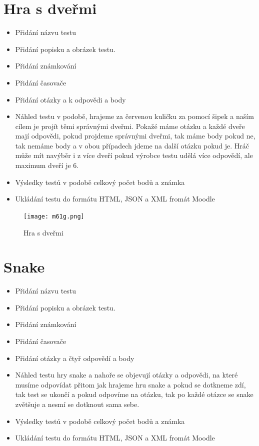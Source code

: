 \documentclass[12pt, a4paper, twoside, openright]{report}
\begin{document}
	\section{Hra s dveřmi}

\begin{itemize}
		\item Přidání názvu testu
		\item Přidání popisku a obrázek testu.
		\item Přidání známkování
		\item Přidání časovače
            \item Přidání otázky a k odpovědi a body
            \item Náhled testu v podobě, hrajeme za červenou kuličku za pomocí šipek a naším cílem je projít těmi
            správnými dveřmi. Pokažé máme otázku a každé dveře mají odpovědi, pokud projdeme správnými dveřmi, tak
            máme body pokud ne, tak nemáme body a v obou případech jdeme na další otázku pokud je. Hráč může mít navýběr i z více dveří pokud výrobce testu udělá více odpovědí, ale maximum dveří je 6.
            \item Výsledky testů v podobě celkový počet bodů a známka
            \item Ukládání testu do formátu HTML, JSON a XML fromát Moodle
	\end{itemize}

    \begin{figure}[h]
		\centering
		\texttt{[image: m61g.png]}
		\caption{Hra s dveřmi}
		\label{fig:architecture}
	\end{figure}

    \section{Snake}

\begin{itemize}
		\item Přidání názvu testu
		\item Přidání popisku a obrázek testu.
		\item Přidání známkování
		\item Přidání časovače
            \item Přidání otázky a čtyř odpovědí a body
            \item Náhled testu hry snake a nahoře se objevují otázky a odpovědi, na které musíme odpovídat přitom jak hrajeme hru snake a pokud se dotkneme zdí, tak test se ukončí a pokud odpovíme na otázku, tak po každé otázce se snake zvětšuje a nesmí se dotknout sama sebe.
            \item Výsledky testů v podobě celkový počet bodů a známka
            \item Ukládání testu do formátu HTML, JSON a XML fromát Moodle
	\end{itemize}
\end{document}
